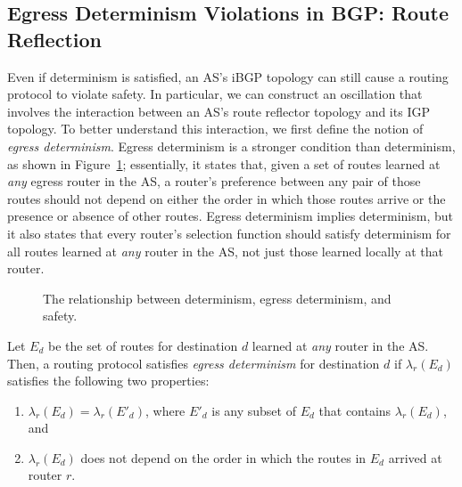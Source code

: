 \subsection{Egress Determinism Violations in BGP: Route Reflection}

Even if determinism is satisfied, an AS's iBGP topology can still cause
a routing protocol to violate
safety.  In particular, we can construct an oscillation that
involves the interaction between an AS's route reflector topology and
its IGP topology.  To better understand this interaction, we first
define the notion of {\em egress determinism}.  Egress determinism is a
stronger condition than determinism, as shown in
Figure~\ref{fig:determinism_venn}; essentially, it states that, given a
set of routes learned at {\em any} egress router in the AS, a router's
preference between any pair of those routes should not depend on either
the order in which those routes arrive or the presence or absence of
other routes.  Egress determinism implies determinism, but it also
states that every router's selection function should satisfy determinism
for all routes learned at {\em any} router in the AS, not just those
learned locally at that router.

\begin{figure}
\centering
\begin{psfrags}
\end{psfrags}
\caption[The relationship between determinism, egress determinism, and
  safety.]{The relationship between determinism, egress determinism, and
  safety.} 
\label{fig:determinism_venn}
\end{figure}


\begin{defn}\label{def:egress_determinism}
Let $E_d$ be the set of routes for destination $d$ learned at {\em any}
router in the AS.  Then, a routing protocol satisfies {\em egress
determinism} for destination $d$ if $\lambda_r(E_d)$ satisfies the
following two properties:
\begin{enumerate}
\itemsep=-1pt
\item $\lambda_r(E_d) = \lambda_r(E'_d)$, where $E'_d$ is any subset of
  $E_d$ that contains $\lambda_r(E_d)$, and
\item $\lambda_r(E_d)$ does not depend on the order in which the routes
  in $E_d$ arrived at router $r$.
\end{enumerate}
\end{defn}

